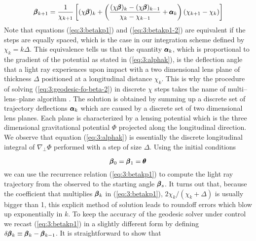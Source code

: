 \begin{equation}
\label{eq:3:betakp1-2}
\pmb{\beta}_{k+1} = \frac{1}{\chi_{k+1}}\left[(\chi\pmb{\beta})_{k} + \left(\frac{(\chi\pmb{\beta})_{k}-(\chi\pmb{\beta})_{k-1}}{\chi_k-\chi_{k-1}}+\pmb{\alpha}_k\right)(\chi_{k+1}-\chi_k) \right]
\end{equation}
%
Note that equations (\ref{eq:3:betakp1}) and (\ref{eq:3:betakp1-2}) are equivalent if the steps are equally spaced, which is the case in our integration scheme defined by $\chi_k=k\Delta$. This equivalence tells us that the quantity $\pmb{\alpha}_k$, which is proportional to the gradient of the potential as stated in (\ref{eq:3:alphak}), is the deflection angle that a light ray experiences upon impact with a two dimensional lens plane of thickness $\Delta$ positioned at a longitudinal distance $\chi_k$. This is why the procedure of solving (\ref{eq:3:geodesic-fo-beta-2}) in discrete $\chi$ steps takes the name of multi--lens--plane algorithm \citep{RayTracingJain,RayTracingHartlap}. The solution is obtained by summing up a discrete set of trajectory deflections $\pmb{\alpha}_k$ which are caused by a discrete set of two dimensional lens planes. Each plane is characterized by a lensing potential which is the three dimensional gravitational potential $\Phi$ projected along the longitudinal direction. We observe that equation (\ref{eq:3:alphak}) is essentially the discrete longitudinal integral of $\nabla_\perp\Phi$ performed with a step of size $\Delta$. Using the initial conditions

\begin{equation}
\label{eq:3:initcond}
\pmb{\beta}_0 = \pmb{\beta}_1 = \pmb{\theta} 
\end{equation}    
%
we can use the recurrence relation (\ref{eq:3:betakp1}) to compute the light ray trajectory from the observed to the starting angle $\pmb{\beta}_s$. It turns out that, because the coefficient that multiplies $\pmb{\beta}_k$ in (\ref{eq:3:betakp1}), $2\chi_k/(\chi_k+\Delta)$ is usually bigger than 1, this explicit method of solution leads to roundoff errors which blow up exponentially in $k$. To keep the accuracy of the geodesic solver under control we recast (\ref{eq:3:betakp1}) in a slightly different form by defining $\delta\pmb{\beta}_k \equiv \pmb{\beta}_k-\pmb{\beta}_{k-1}$. It is straightforward to show that

